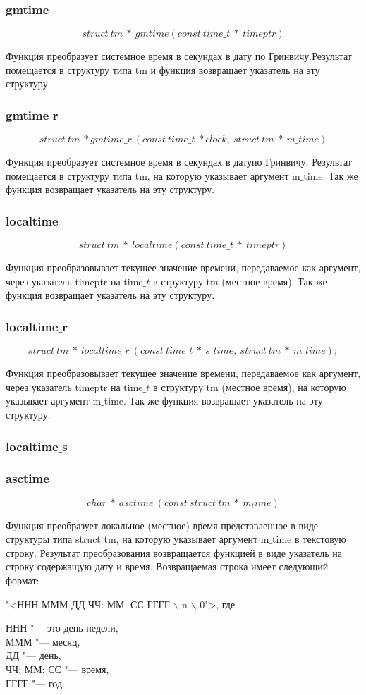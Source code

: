 \documentclass{article}
\begin{document}
			\subsubsection*{gmtime}	
			$$struct~tm~*~gmtime(const~time\_t~*~timeptr)$$
			
				Функция преобразует системное время в секундах в дату по Гринвичу.Результат помещается в структуру типа tm и 					функция возвращает указатель на эту структуру.
			\subsubsection*{gmtime$\_$r}
			$$struct~tm~*gmtime\_r~(const~time\_t~*clock,~struct~tm~*~m\_time)$$			
			
				Функция преобразует системное время в секундах в датупо Гринвичу. Результат помещается в структуру типа tm, на 					которую указывает аргумент m$\_$time. Так же функция возвращает указатель на эту структуру. 			
			\subsubsection*{localtime}
			$$struct~tm~*~localtime(const~time\_t~*~timeptr)$$
			
				Функция преобразовывает текущее значение времени, передаваемое как аргумент, через указатель timeptr на time$\_t$ 			в структуру tm (местное время). Так же функция возвращает указатель на эту структуру.
			\subsubsection*{localtime$\_$r}
			$$struct~tm~*~localtime\_r~(const~time\_t~*~s\_time,~struct~tm~*~m\_time);$$
			
				Функция преобразовывает текущее значение времени, передаваемое как аргумент, через указатель timeptr на time$\_t$ 			в структуру tm (местное время), на которую указывает аргумент m$\_$time. Так же функция возвращает указатель на эту 				структуру.	
			\subsubsection*{localtime$\_$s}		
			\subsubsection*{asctime}
			$$char~*~asctime~(const~struct~tm~*~m_time)$$			
			
				Функция преобразует локальное (местное) время представленное в виде структуры типа struct tm, на которую 						указывает аргумент m$\_$time в текстовую строку. Результат преобразования возвращается функцией в виде указатель на 				строку содержащую дату и время. 
			Возвращаемая строка имеет следующий формат:
			\begin{center}
				"<ННН МММ ДД ЧЧ: ММ: СС ГГГГ $\backslash$ n $\backslash$ 0">, где\\
			\end{center}
			ННН "--- это день недели,\\
			МММ "--- месяц,\\
			ДД "--- день,\\
			ЧЧ: ММ: СС "--- время,\\
			ГГГГ "--- год.
\end{document}
